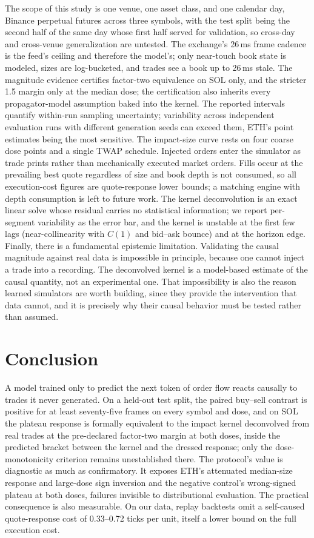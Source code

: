 \documentclass[11pt]{article}
\begin{document}
The scope of this study is one venue, one asset class, and one calendar day, Binance perpetual futures across three symbols, with the test split being the second half of the same day whose first half served for validation, so cross-day and cross-venue generalization are untested. The exchange's 26\,ms frame cadence is the feed's ceiling and therefore the model's; only near-touch book state is modeled, sizes are log-bucketed, and trades see a book up to 26\,ms stale. The magnitude evidence certifies factor-two equivalence on SOL only, and the stricter 1.5 margin only at the median dose; the certification also inherits every propagator-model assumption baked into the kernel. The reported intervals quantify within-run sampling uncertainty; variability across independent evaluation runs with different generation seeds can exceed them, ETH's point estimates being the most sensitive. The impact-size curve rests on four coarse dose points and a single TWAP schedule. Injected orders enter the simulator as trade prints rather than mechanically executed market orders. Fills occur at the prevailing best quote regardless of size and book depth is not consumed, so all execution-cost figures are quote-response lower bounds; a matching engine with depth consumption is left to future work. The kernel deconvolution is an exact linear solve whose residual carries no statistical information; we report per-segment variability as the error bar, and the kernel is unstable at the first few lags (near-collinearity with $C(1)$ and bid--ask bounce) and at the horizon edge. Finally, there is a fundamental epistemic limitation. Validating the causal magnitude against real data is impossible in principle, because one cannot inject a trade into a recording. The deconvolved kernel is a model-based estimate of the causal quantity, not an experimental one. That impossibility is also the reason learned simulators are worth building, since they provide the intervention that data cannot, and it is precisely why their causal behavior must be tested rather than assumed.

\section{Conclusion}

A model trained only to predict the next token of order flow reacts causally to trades it never generated. On a held-out test split, the paired buy--sell contrast is positive for at least seventy-five frames on every symbol and dose, and on SOL the plateau response is formally equivalent to the impact kernel deconvolved from real trades at the pre-declared factor-two margin at both doses, inside the predicted bracket between the kernel and the dressed response; only the dose-monotonicity criterion remains unestablished there. The protocol's value is diagnostic as much as confirmatory. It exposes ETH's attenuated median-size response and large-dose sign inversion and the negative control's wrong-signed plateau at both doses, failures invisible to distributional evaluation. The practical consequence is also measurable. On our data, replay backtests omit a self-caused quote-response cost of 0.33--0.72 ticks per unit, itself a lower bound on the full execution cost.
\end{document}
